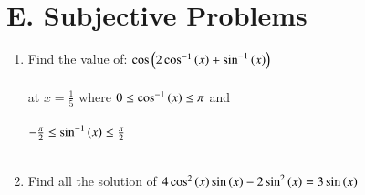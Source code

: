 \documentclass[journal,12pt,twocolumn]{IEEEtran}
\theoremstyle{remark}
\begin{document}
\section*{E. Subjective Problems}
\begin{enumerate}
\item Find the value of: $\cos \left(2\cos ^{-1}\left(x\right)+\sin ^{-1}\left(x\right)\right)$\\\\ at $x=\frac{1}{5}$ where $0\le \cos ^{-1}\left(x\right) \le \pi$ and \\\\ $-\frac{\pi}{2}\le \sin ^{-1}\left(x\right) \le\frac{\pi}{2}$
\hfill {}\\\\
\item Find all the solution of $4\cos ^2\left(x\right)\sin \left(x\right)-2\sin ^2 \left(x\right) = 3\sin \left(x\right)$
\hfill {}
\end{enumerate}
\end{document}
